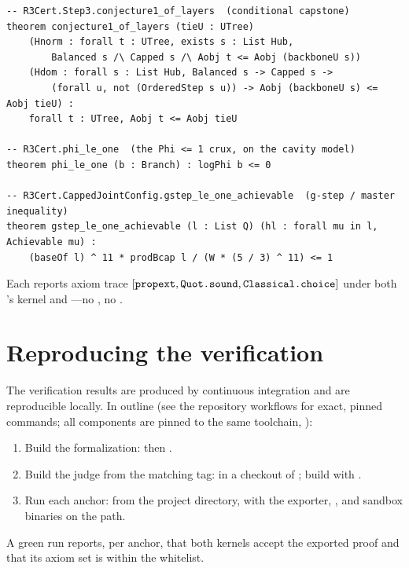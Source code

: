 \begin{lstlisting}
-- R3Cert.Step3.conjecture1_of_layers  (conditional capstone)
theorem conjecture1_of_layers (tieU : UTree)
    (Hnorm : forall t : UTree, exists s : List Hub,
        Balanced s /\ Capped s /\ Aobj t <= Aobj (backboneU s))
    (Hdom : forall s : List Hub, Balanced s -> Capped s ->
        (forall u, not (OrderedStep s u)) -> Aobj (backboneU s) <= Aobj tieU) :
    forall t : UTree, Aobj t <= Aobj tieU

-- R3Cert.phi_le_one  (the Phi <= 1 crux, on the cavity model)
theorem phi_le_one (b : Branch) : logPhi b <= 0

-- R3Cert.CappedJointConfig.gstep_le_one_achievable  (g-step / master inequality)
theorem gstep_le_one_achievable (l : List Q) (hl : forall mu in l, Achievable mu) :
    (baseOf l) ^ 11 * prodBcap l / (W * (5 / 3) ^ 11) <= 1
\end{lstlisting}
Each reports axiom trace $[\texttt{propext}, \texttt{Quot.sound}, \texttt{Classical.choice}]$
under both \Lean's kernel and \nanoda---no , no .

\section{Reproducing the verification}
\label{app:repro}

The verification results are produced by continuous integration and are reproducible
locally. In outline (see the repository workflows for exact, pinned commands; all
components are pinned to the same \Lean{} toolchain, ):
\begin{enumerate}[nosep,leftmargin=1.4em]
  \item Build the formalization:  then .
  \item Build the judge from the matching tag:
     in a checkout of ;
    build \nanoda{} with .
  \item Run each anchor:  from the
    project directory, with the exporter, \nanoda, and sandbox binaries on the path.
\end{enumerate}
A green run reports, per anchor, that both kernels accept the exported proof and that
its axiom set is within the whitelist.
